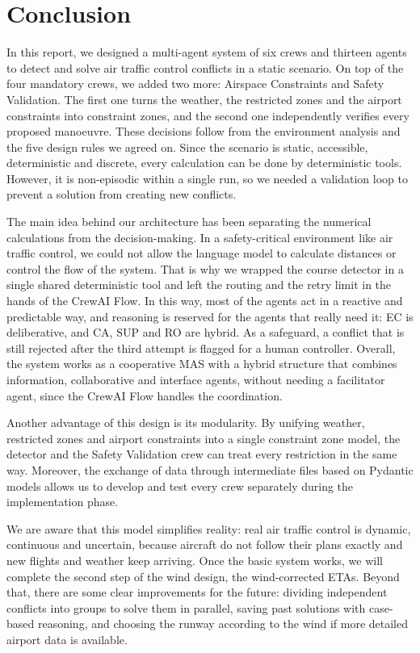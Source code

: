 \section{Conclusion}
\label{sec:conclusion}

In this report, we designed a multi-agent system of six crews and thirteen agents to detect
and solve air traffic control conflicts in a static scenario. On top of the four mandatory
crews, we added two more: Airspace Constraints and Safety Validation. The first one turns
the weather, the restricted zones and the airport constraints into constraint zones, and the
second one independently verifies every proposed manoeuvre. These decisions follow from the
environment analysis and the five design rules we agreed on. Since the scenario is static,
accessible, deterministic and discrete, every calculation can be done by deterministic
tools. However, it is non-episodic within a single run, so we needed a validation loop to
prevent a solution from creating new conflicts.

The main idea behind our architecture has been separating the numerical calculations from
the decision-making. In a safety-critical environment like air traffic control, we could not
allow the language model to calculate distances or control the flow of the system. That is
why we wrapped the course detector in a single shared deterministic tool and left the
routing and the retry limit in the hands of the CrewAI Flow. In this way, most of the agents
act in a reactive and predictable way, and reasoning is reserved for the agents that really
need it: EC is deliberative, and CA, SUP and RO are hybrid. As a safeguard, a conflict that
is still rejected after the third attempt is flagged for a human controller. Overall, the system
works as a cooperative MAS with a hybrid structure that combines information, collaborative
and interface agents, without needing a facilitator agent, since the CrewAI Flow handles
the coordination.

Another advantage of this design is its modularity. By unifying weather, restricted zones
and airport constraints into a single constraint zone model, the detector and the Safety
Validation crew can treat every restriction in the same way. Moreover, the exchange of data
through intermediate files based on Pydantic models allows us to develop and test every crew
separately during the implementation phase.

We are aware that this model simplifies reality: real air traffic control is dynamic,
continuous and uncertain, because aircraft do not follow their plans exactly and new
flights and weather keep arriving. Once the basic system works, we will complete the second
step of the wind design, the wind-corrected ETAs. Beyond that, there are some clear
improvements for the future: dividing independent conflicts into groups to solve them in
parallel, saving past solutions with case-based reasoning, and choosing the runway according
to the wind if more detailed airport data is available.
